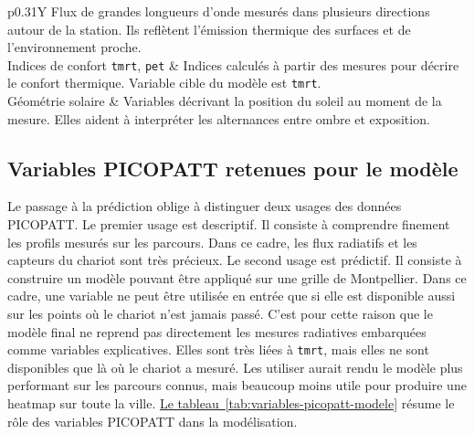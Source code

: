 \documentclass{article}
\begin{document}
\begin{table}[H]
\begin{tabularx}{\textwidth}{p{}Y}
Flux de grandes longueurs d'onde mesurés dans plusieurs directions autour de la station. Ils reflètent l'émission thermique des surfaces et de l'environnement proche. \\
\addlinespace
Indices de confort \newline \texttt{tmrt}, \texttt{pet} &
Indices calculés à partir des mesures pour décrire le confort thermique. Variable cible du modèle est \texttt{tmrt}. \\
\addlinespace
Géométrie solaire &
Variables décrivant la position du soleil au moment de la mesure. Elles aident à interpréter les alternances entre ombre et exposition. \\
\bottomrule
\end{tabularx}
\caption{Synthèse des principales familles de variables disponibles dans les mesures PICOPATT.}
\vspace{-0.45cm}
\caption*{\footnotesize Source : AAU - ENSA Nantes.}
\label{tab:variables_picopatt}
\end{table}

\subsection{Variables PICOPATT retenues pour le modèle}

Le passage à la prédiction oblige à distinguer deux usages des données PICOPATT. Le premier usage est descriptif. Il consiste à comprendre finement les profils mesurés sur les parcours. Dans ce cadre, les flux radiatifs et les capteurs du chariot sont très précieux. Le second usage est prédictif. Il consiste à construire un modèle pouvant être appliqué sur une grille de Montpellier. Dans ce cadre, une variable ne peut être utilisée en entrée que si elle est disponible aussi sur les points où le chariot n'est jamais passé. C'est pour cette raison que le modèle final ne reprend pas directement les mesures radiatives embarquées comme variables explicatives. Elles sont très liées à \texttt{tmrt}, mais elles ne sont disponibles que là où le chariot a mesuré. Les utiliser aurait rendu le modèle plus performant sur les parcours connus, mais beaucoup moins utile pour produire une heatmap sur toute la ville. \hyperref[tab:variables-picopatt-modele]{Le tableau~\ref{tab:variables-picopatt-modele}} résume le rôle des variables PICOPATT dans la modélisation.
\end{document}
